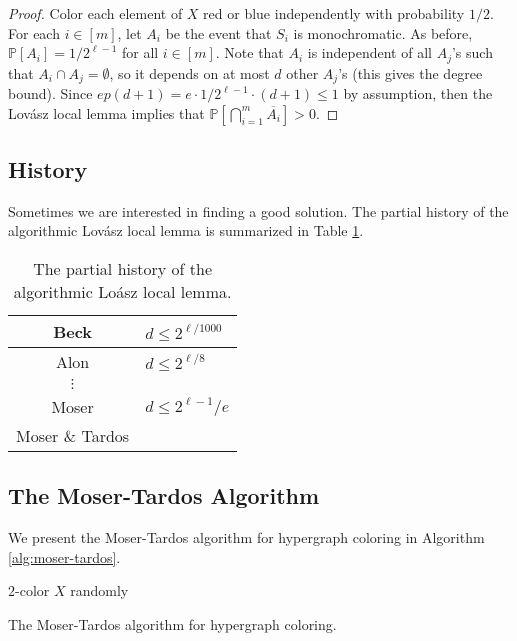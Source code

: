 \documentclass[letterpaper, reqno,11pt]{article}
\newcommand{\PP}{\mathbb{P}}
\begin{document}
\begin{proof}
  Color each element of $X$ red or blue independently with probability $1/2$. For each $i \in [m]$, let $A_i$ be the event that $S_i$ is monochromatic. As before, $\PP[A_i] = 1/2^{\ell - 1}$ for all $i \in [m]$. Note that $A_i$ is independent of all $A_j$'s such that $A_i \cap A_j = \emptyset$, so it depends on at most $d$ other $A_j$'s (this gives the degree bound). Since $ep(d + 1) = e \cdot 1/2^{\ell - 1} \cdot (d + 1) \leq 1$ by assumption, then the Lov\'{a}sz local lemma implies that $\PP[\bigcap_{i = 1}^m \overline{A_i}] > 0$.
\end{proof}

\subsection{History}

Sometimes we are interested in finding a good solution. The partial history of the algorithmic Lov\'{a}sz local lemma is summarized in Table \ref{tab:lll}.

\begin{table}[h]
  \centering
  \begin{tabular}{c|l}
    Beck & $d \leq 2^{\ell/1000}$ \\
    \hline
    Alon & $d \leq 2^{\ell/8}$ \\
    \hline
    $\vdots$ \\
    \hline
    Moser & $d \leq 2^{\ell - 1}/e$ \\
    Moser \& Tardos
  \end{tabular}
  \caption{The partial history of the algorithmic Lo\'{a}sz local lemma.}
  \label{tab:lll}
\end{table}

\subsection{The Moser-Tardos Algorithm}

We present the Moser-Tardos algorithm for hypergraph coloring in Algorithm \ref{alg:moser-tardos}.

\begin{algorithm}
  \DontPrintSemicolon
  $2$-color $X$ randomly \\
  \caption{The Moser-Tardos algorithm for hypergraph coloring.}
  \label{alg:moser-tardos}
\end{algorithm}
\end{document}
